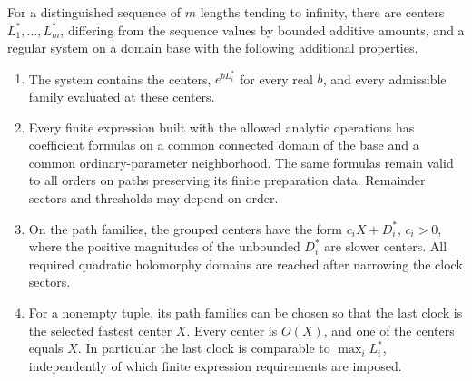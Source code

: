 \begin{proposition}\label{path:centers}
For a distinguished sequence of \(m\) lengths tending to infinity,
there are centers \(L_1^*,\ldots,L_m^*\), differing from the sequence
values by bounded additive amounts, and a regular system on a domain
base with the following additional properties.
\begin{enumerate}[label=\textup{(\alph*)}]
\item The system contains the centers, \(e^{bL_i^*}\) for every real
\(b\), and every admissible family evaluated at these centers.
\item Every finite expression built with the allowed analytic
operations has coefficient formulas on a common connected domain of
the base and a common ordinary-parameter neighborhood.  The same
formulas remain valid to all orders on paths preserving its finite
preparation data.  Remainder sectors and thresholds may depend on
order.
\item On the path families, the grouped centers have the form
\(c_iX+D_i^*\), \(c_i>0\), where the positive magnitudes of the
unbounded \(D_i^*\) are slower centers.  All required quadratic
holomorphy domains are reached after narrowing the clock sectors.
\item For a nonempty tuple, its path families can be chosen so that
the last clock is the selected fastest center \(X\).  Every center
is \(O(X)\), and one of the centers equals \(X\).  In particular
the last clock is comparable to \(\max_iL_i^*\), independently
of which finite expression requirements are imposed.
\end{enumerate}
\end{proposition}
